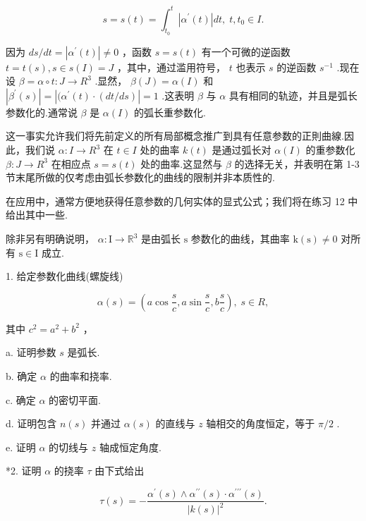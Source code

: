 \[
s = s\left( t\right)  = {\int }_{{t}_{0}}^{t}\left| {{\alpha }^{\prime }\left( t\right) }\right| {dt},\;t,{t}_{0} \in  I.
\]

因为 \({ds}/{dt} = \left| {{\alpha }^{\prime }\left( t\right) }\right|  \neq  0\) ，函数 \(s = s\left( t\right)\) 有一个可微的逆函数 \(t = t\left( s\right) ,s \in  s\left( I\right)  = J\) ，其中，通过滥用符号， \(t\) 也表示 \(s\) 的逆函数 \({s}^{-1}\) .现在设 \(\beta  = \alpha  \circ  t : J \rightarrow  {R}^{3}\) .显然， \(\beta \left( J\right)  = \alpha \left( I\right)\) 和 \(\left| {{\beta }^{\prime }\left( s\right) }\right|  = \left| {({\alpha }^{\prime }\left( t\right)  \cdot  \left( {{dt}/{ds}}\right) }\right|  = 1\) .这表明 \(\beta\) 与 \(\alpha\) 具有相同的轨迹，并且是弧长参数化的.通常说 \(\beta\) 是 \(\alpha \left( I\right)\) 的弧长重参数化.

这一事实允许我们将先前定义的所有局部概念推广到具有任意参数的正則曲線.因此，我们说 \(\alpha  : I \rightarrow  {R}^{3}\) 在 \(t \in  I\) 处的曲率 \(k\left( t\right)\) 是通过弧长对 \(\alpha \left( I\right)\) 的重参数化 \(\beta  : J \rightarrow  {R}^{3}\) 在相应点 \(s = s\left( t\right)\) 处的曲率.这显然与 \(\beta\) 的选择无关，并表明在第 1-3 节末尾所做的仅考虑由弧长参数化的曲线的限制并非本质性的.

在应用中，通常方便地获得任意参数的几何实体的显式公式；我们将在练习 12 中给出其中一些.

\exerciseline

除非另有明确说明， \(\alpha  : \mathrm{I} \rightarrow  {\mathbb{R}}^{3}\) 是由弧长 \(\mathrm{s}\) 参数化的曲线，其曲率 \(\mathrm{k}\left( \mathrm{s}\right)  \neq  0\) 对所有 \(\mathrm{s} \in  \mathrm{I}\) 成立.

1. 给定参数化曲线(螺旋线)

\[
\alpha \left( s\right)  = \left( {a\cos \frac{s}{c},a\sin \frac{s}{c},b\frac{s}{c}}\right) ,\;s \in  R,
\]

其中 \({c}^{2} = {a}^{2} + {b}^{2}\) ，

a. 证明参数 \(s\) 是弧长.

b. 确定 \(\alpha\) 的曲率和挠率.

c. 确定 \(\alpha\) 的密切平面.

d. 证明包含 \(n\left( s\right)\) 并通过 \(\alpha \left( s\right)\) 的直线与 \(z\) 轴相交的角度恒定，等于 \(\pi /2\) .

e. 证明 \(\alpha\) 的切线与 \(z\) 轴成恒定角度.

*2. 证明 \(\alpha\) 的挠率 \(\tau\) 由下式给出

\[
\tau \left( s\right)  =  - \frac{{\alpha }^{\prime }\left( s\right)  \land  {\alpha }^{\prime \prime }\left( s\right)  \cdot  {\alpha }^{\prime \prime \prime }\left( s\right) }{{\left| k\left( s\right) \right| }^{2}}.
\]

